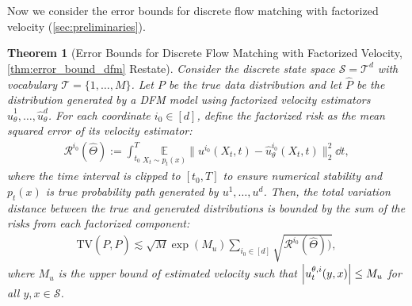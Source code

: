 \documentclass[12pt]{article}
\numberwithin{equation}{section}
\let\hat\widehat
\newcommand{\wh}{\widehat}
\renewcommand{\hat}{\wh}
\DeclareMathOperator*{\E}{{\mathbb{E}}}
\def\E{\mathbb{E}}
\theoremstyle{theoremstyle}
\newtheorem{theorem}{Theorem}[section]
\numberwithin{equation}{section}
\numberwithin{theorem}{section}
\numberwithin{proposition}{section}
\numberwithin{definition}{section}
\numberwithin{lemma}{section}
\numberwithin{assumption}{section}
\numberwithin{remark}{section}
\begin{document}
Now we consider the error bounds for discrete flow matching with factorized velocity  (\cref{sec:preliminaries}).

\begin{theorem}
[Error Bounds for Discrete Flow Matching with Factorized Velocity, \cref{thm:error_bound_dfm} Restate]
\label{thm:main_proof_dfm_error_bound}
Consider the discrete state space $\mathcal{S} = \mathcal{T}^d$ with vocabulary $\mathcal{T} = \{1, \ldots, M\}$. 
Let $P$ be the true data distribution and let $\hat{P}$ be the distribution generated by a DFM model using factorized velocity estimators $\hat{u}_\theta^1, \ldots, \hat{u}_\theta^d$.
For each coordinate $i_0 \in [d]$, define the factorized risk as the mean squared error of its velocity estimator:
\begin{align*}
    \mathcal{R}^{i_0}(\hat{\Theta}) 
    := \int_{t_0}^T \underset{X_t\sim p_t(x)}
    {\E}\|u^{i_0}(X_t,t) - \hat{u}^{i_0}_\theta(X_t,t)\|_2^2 \dd t,
\end{align*}
where the time interval is clipped to $[t_0, T]$ to ensure numerical stability and $p_t(x)$ is true probability path generated by $u^1, \ldots, u^d$. Then, the total variation distance between the true and generated distributions is bounded by the sum of the risks from each factorized component:
\begin{align*}
    \text{TV}(P,\hat{P})
    \lesssim 
    \sqrt{M} \exp(M_u) 
    \sum_{i_0 \in [d]} \sqrt{\mathcal{R}^{i_0}(\hat{\Theta}))},
\end{align*}
where $M_u$ is the upper bound of estimated velocity such that $\abs{u_t^{\theta,i}(y,x)} \leq M_u$ for all $y,x \in \mathcal{S}$.
\end{theorem}
\end{document}
